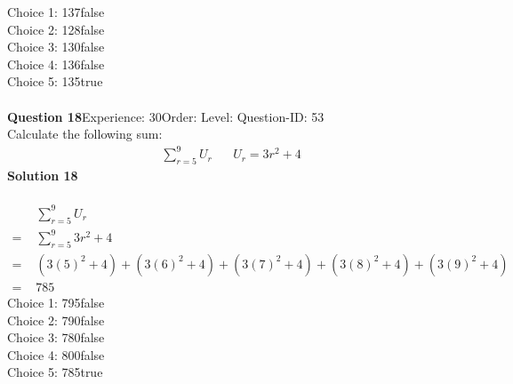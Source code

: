 \documentclass{article}
\begin{document}
Choice 1: \hspace{20pt}137\hspace{20pt}false\\
Choice 2: \hspace{20pt}128\hspace{20pt}false\\
Choice 3: \hspace{20pt}130\hspace{20pt}false\\
Choice 4: \hspace{20pt}136\hspace{20pt}false\\
Choice 5: \hspace{20pt}135\hspace{20pt}true\\
\\[4pt]
\noindent\textbf{Question 18}\hspace{20pt}Experience: 30\hspace{20pt}Order: \hspace{20pt}Level: \hspace{20pt}Question-ID: 53\\[2pt]
Calculate the following sum:
\begin{align*}
\sum_{r=5}^{9} U_r \hspace{20pt}U_r=3r^2+4
\end{align*}
\noindent\textbf{Solution 18}\\[2pt]
\\[-35pt]\begin{align*}
&\sum_{r=5}^{9} U_r\\[2pt]
=\,\,&\sum_{r=5}^{9} 3r^2+4\\[2pt]
=\,\,&(3(5)^2+4)+(3(6)^2+4)+(3(7)^2+4)+(3(8)^2+4)+(3(9)^2+4) \\[2pt]
=\,\,&785
\end{align*}
Choice 1: \hspace{20pt}795\hspace{20pt}false\\
Choice 2: \hspace{20pt}790\hspace{20pt}false\\
Choice 3: \hspace{20pt}780\hspace{20pt}false\\
Choice 4: \hspace{20pt}800\hspace{20pt}false\\
Choice 5: \hspace{20pt}785\hspace{20pt}true\\
\end{document}
